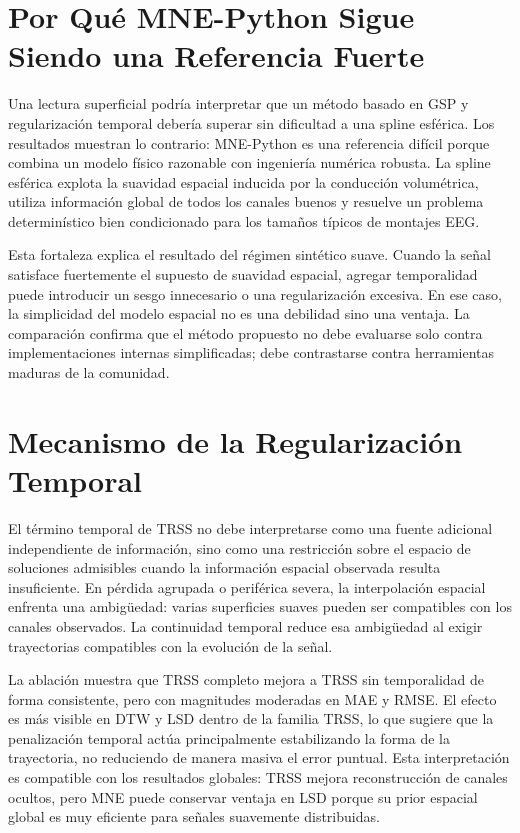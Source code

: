 \section{Por Qué MNE-Python Sigue Siendo una Referencia Fuerte}

Una lectura superficial podría interpretar que un método basado en GSP y regularización temporal debería superar sin dificultad a una spline esférica. Los resultados muestran lo contrario: MNE-Python es una referencia difícil porque combina un modelo físico razonable con ingeniería numérica robusta. La spline esférica explota la suavidad espacial inducida por la conducción volumétrica, utiliza información global de todos los canales buenos y resuelve un problema determinístico bien condicionado para los tamaños típicos de montajes EEG.

Esta fortaleza explica el resultado del régimen sintético suave. Cuando la señal satisface fuertemente el supuesto de suavidad espacial, agregar temporalidad puede introducir un sesgo innecesario o una regularización excesiva. En ese caso, la simplicidad del modelo espacial no es una debilidad sino una ventaja. La comparación confirma que el método propuesto no debe evaluarse solo contra implementaciones internas simplificadas; debe contrastarse contra herramientas maduras de la comunidad.

\section{Mecanismo de la Regularización Temporal}

El término temporal de TRSS no debe interpretarse como una fuente adicional independiente de información, sino como una restricción sobre el espacio de soluciones admisibles cuando la información espacial observada resulta insuficiente. En pérdida agrupada o periférica severa, la interpolación espacial enfrenta una ambigüedad: varias superficies suaves pueden ser compatibles con los canales observados. La continuidad temporal reduce esa ambigüedad al exigir trayectorias compatibles con la evolución de la señal.

La ablación muestra que TRSS completo mejora a TRSS sin temporalidad de forma consistente, pero con magnitudes moderadas en MAE y RMSE. El efecto es más visible en DTW y LSD dentro de la familia TRSS, lo que sugiere que la penalización temporal actúa principalmente estabilizando la forma de la trayectoria, no reduciendo de manera masiva el error puntual. Esta interpretación es compatible con los resultados globales: TRSS mejora reconstrucción de canales ocultos, pero MNE puede conservar ventaja en LSD porque su prior espacial global es muy eficiente para señales suavemente distribuidas.

